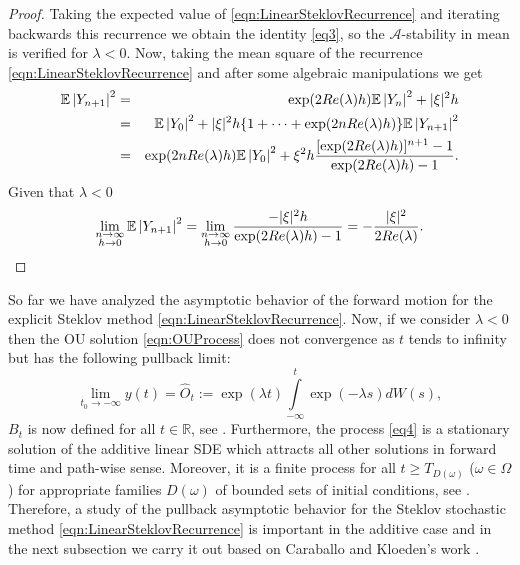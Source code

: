 	\begin{proof}  
		Taking the expected value of \eqref{eqn:LinearSteklovRecurrence} and iterating
		backwards this recurrence we obtain the identity \eqref{eq3}, so the
		$\mathcal{A}$-stability in mean is verified for $\lambda<0$. Now, taking the mean
		square of the recurrence \eqref{eqn:LinearSteklovRecurrence} and after some algebraic
		manipulations we get
		\begin{eqnarray*}\label{eqn:SteklovMS-Stable1}
			\mathbb{E}\left|Y_{n+1}\right|^2&
			=&\exp(2Re(\lambda)h)
				\mathbb{E}\left|Y_n\right|^2+|\xi|^2 h\\
			&=& 
				\mathbb{E}\left|Y_{0}\right|^2+|\xi|^2h
				\{1+\cdots+
				\exp(2n Re(\lambda) h)\}
				\mathbb{E}\left|Y_{n+1}\right|^2\\
			&=&
				\exp(2n Re(\lambda) h)
				\mathbb{E}\left|Y_0\right|^2
				+\xi^2 h
				\frac{[\exp(2Re(\lambda)h)]^{n+1}-1}{\exp(2Re(\lambda)h)-1}.
		\end{eqnarray*}
		Given that $\lambda<0$
		\begin{eqnarray*}
		\lim_{\substack{ n\to \infty\\ h\to 0}}
		\mathbb{E}\left|Y_{n+1}\right|^2=\lim_{\substack{ n\to \infty\\ h\to 0}}
		\frac{-|\xi|^2 h}{\exp(2Re(\lambda)h)-1}=
		-\frac{|\xi|^2}{2Re(\lambda)}.
		\end{eqnarray*}
	\end{proof}
	So far we have analyzed  the asymptotic behavior of the forward motion for the explicit
	Steklov method  \eqref{eqn:LinearSteklovRecurrence}. Now, if we consider $\lambda<0$
	then the OU solution \eqref{eqn:OUProcess} does not convergence as $t$ tends to infinity
	but has the following pullback limit:
	\begin{equation}\label{eq4}
		\lim_{t_0\to-\infty} y(t)=\widehat{O}_t:=
		\exp(\lambda t)\int\limits_{-\infty}^{t}\exp(-\lambda s)dW(s), 
	\end{equation}
	$B_t$  is now defined for all $t\in\mathbb{R}$, see
	\cite{Arnold1998, kloeden1999towards}. Furthermore, the process \eqref{eq4} is a
	stationary solution  of the additive linear SDE which attracts all other solutions in
	forward time and path-wise sense. Moreover, it is a finite process for all $t\geq
	T_{D(\omega)}$ ($\omega\in \Omega$) for  appropriate families $D(\omega)$ of bounded
	sets of initial conditions, see \cite{Robinson2002}. Therefore, a study of the pullback
	asymptotic behavior for the Steklov stochastic method
	\eqref{eqn:LinearSteklovRecurrence} is important in the additive case and in the next
	subsection we carry it out based on Caraballo and Kloeden's work  \cite{Caraballo2006}.
